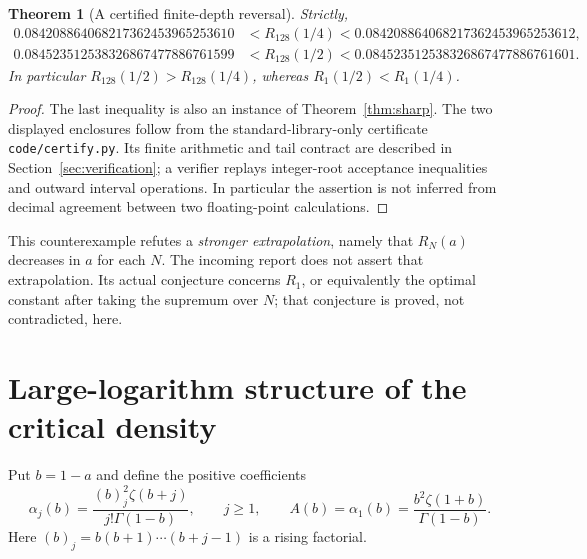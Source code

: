 \documentclass[11pt]{article}
\numberwithin{equation}{section}
\newtheorem{theorem}{Theorem}[section]
\theoremstyle{definition}\newtheorem{definition}[theorem]{Definition}
\theoremstyle{remark}\newtheorem{remark}[theorem]{Remark}
\begin{document}
\begin{theorem}[A certified finite-depth reversal]\label{thm:reversal}
Strictly,
\begin{align}
 0.084208864068217362453965253610
 &<R_{128}(1/4)
 <0.084208864068217362453965253612,
 \label{eq:certquarter}\\
 0.084523512538326867477886761599
 &<R_{128}(1/2)
 <0.084523512538326867477886761601.
 \label{eq:certhalf}
\end{align}
In particular $R_{128}(1/2)>R_{128}(1/4)$, whereas
$R_1(1/2)<R_1(1/4)$.
\end{theorem}
\begin{proof}
The last inequality is also an instance of Theorem~\ref{thm:sharp}.
The two displayed enclosures follow from the standard-library-only
certificate \texttt{code/certify.py}. Its finite arithmetic and tail
contract are described in Section~\ref{sec:verification}; a verifier
replays integer-root acceptance inequalities and outward interval
operations. In particular the assertion is not inferred from decimal
agreement between two floating-point calculations.
\end{proof}

This counterexample refutes a \emph{stronger extrapolation}, namely that
$R_N(a)$ decreases in $a$ for each $N$. The incoming report does not
assert that extrapolation. Its actual conjecture concerns $R_1$, or
equivalently the optimal constant after taking the supremum over $N$;
that conjecture is proved, not contradicted, here.

\section{Large-logarithm structure of the critical density}
\label{sec:densityasymp}
Put $b=1-a$ and define the positive coefficients
\begin{equation}\label{eq:alphaj}
 \alpha_j(b)=\frac{(b)_j^2\zeta(b+j)}{j!\Gamma(1-b)},
 \qquad j\ge1,
 \qquad A(b)=\alpha_1(b)=\frac{b^2\zeta(1+b)}{\Gamma(1-b)}.
\end{equation}
Here $(b)_j=b(b+1)\cdots(b+j-1)$ is a rising factorial.
\end{document}
